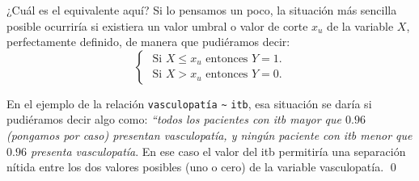 ¿Cuál es el equivalente aquí? Si lo pensamos un poco, la situación más sencilla posible ocurriría si existiera un {\sf valor umbral} o {\sf valor de corte} $x_u$ de la variable $X$, perfectamente definido, de
manera que pudiéramos decir:
\[
\begin{cases}
\mbox{ Si $X\leq x_u$ entonces $Y=1$.}\\[3mm]
\mbox{ Si $X>x_u$ entonces $Y=0$.}
\end{cases}
\]


\begin{ejemplo}
	\label{cap13:ejem:RegresionLogistica02}
	En el ejemplo de la relación \texttt{vasculopatía} \verb#~# \texttt{itb}, esa situación se daría si pudiéramos decir algo como: {\em ``todos los pacientes con itb mayor que $0.96$ (pongamos por caso)  presentan vasculopatía, y ningún paciente con itb menor que $0.96$ presenta vasculopatía}.  En ese caso el valor del itb permitiría una separación nítida entre los dos valores posibles (uno o cero) de la variable vasculopatía.
\qed
\end{ejemplo}


